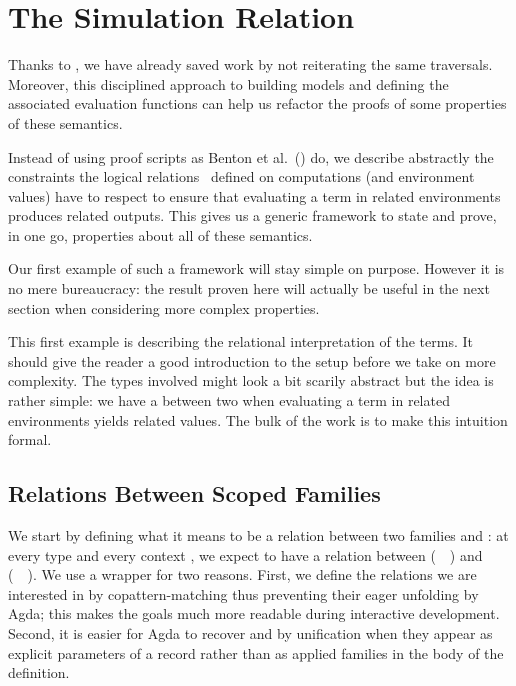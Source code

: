 \chapter{The Simulation Relation}
\label{sec:simulationrel}

Thanks to , we have already saved work by not reiterating the
same traversals. Moreover, this disciplined approach to building models and
defining the associated evaluation functions can help us refactor the proofs
of some properties of these semantics.

Instead of using proof scripts as Benton et al.~(\citeyear{benton2012strongly})
do, we describe abstractly the constraints the logical relations~\cite{reynolds1983types}
defined on computations (and environment values) have to respect to ensure
that evaluating a term in related environments
produces related outputs. This gives us a generic framework to
state and prove, in one go, properties about all of these semantics.

Our first example of such a framework will stay simple on purpose.
However it is no mere bureaucracy: the
result proven here will actually be useful in the next section
when considering more complex properties.

This first example is describing the relational interpretation of the terms.
It should give the reader a good introduction to the setup before we take on
more complexity. The types involved might look a bit scarily abstract but the
idea is rather simple: we have a  between two 
when evaluating a term in related environments yields related values. The bulk
of the work is to make this intuition formal.

\section{Relations Between Scoped Families}

We start by defining what it means to be a relation between two 
families  and : at every type  and every context , we
expect to have a relation between (~~) and (~~).
We use a  wrapper for two reasons. First, we define the relations we
are interested in by copattern-matching thus preventing their eager unfolding by
Agda; this makes the goals much more readable during interactive development.
Second, it is easier for Agda to recover  and  by unification when
they appear as explicit parameters of a record rather than as applied families
in the body of the definition.


